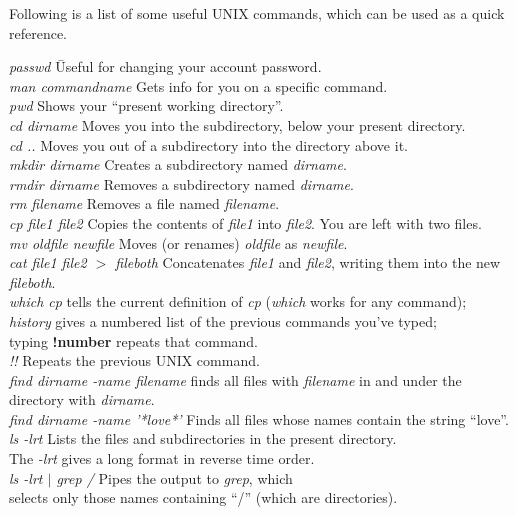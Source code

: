 	Following is a list of some useful UNIX commands, which can be
used as a quick reference.  
 

\begin{tabbing}
\textit{passwd} \hspace{1.6in} \=  Useful for changing your account password. \\
\textit{man commandname} \> Gets info for you on a specific command. \\
\textit{pwd} \> Shows your ``present working directory''. \\
\textit{cd dirname} \> Moves you into the subdirectory, below your 
present directory. \\
\textit{cd ..} \> Moves you out of a subdirectory into the directory above
it. \\
\textit{mkdir dirname} \> Creates a subdirectory named \textit{dirname}. \\
\textit{rmdir dirname} \> Removes a subdirectory named \textit{dirname}. \\
\textit{rm filename} \> Removes a file named \textit{filename}. \\ 
\textit{cp file1 file2} \> Copies the contents of \textit{file1} into 
\textit{file2}. You are left with two files. \\
\textit{mv oldfile newfile} \> Moves (or renames) \textit{oldfile} as 
\textit{newfile}. \\
\textit{cat file1 file2 $>$ fileboth} \> Concatenates {\it file1} and {\it
file2}, writing them into the new {\it fileboth}. \\
\textit{which cp} \> tells the current definition of {\it cp} ({\it which}
works for any command); \\
\textit{history} \> gives a numbered list of the previous commands you've
typed; \\
\> typing {\bf !number} repeats that command. \\
\textit{!!} \> Repeats the previous UNIX command. \\
\textit{find dirname -name filename} \> finds all files with {\it
filename} in and under the directory with {\it dirname}. \\
\textit{find dirname -name '*love*'} \> Finds all files whose names 
contain the string ``love''. \\
\textit{ls -lrt} \> Lists the files and subdirectories 
in the present directory. \\
\>The {\it -lrt} gives a long format in reverse time order.\\
\textit{ls -lrt $|$ grep /} \> Pipes the output to {\it grep}, which \\
\> selects only those names containing ``/'' (which are directories). \\


\end{tabbing}
